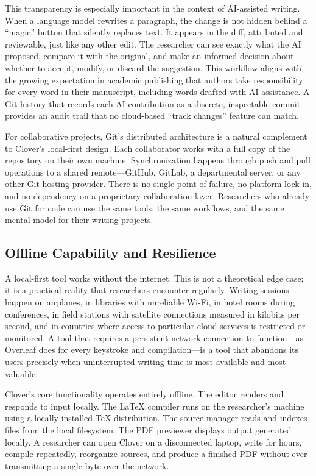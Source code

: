 \documentclass[a4paper,11pt]{article}
\begin{document}
This transparency is especially important in the context of AI-assisted writing. When a language model rewrites a paragraph, the change is not hidden behind a ``magic'' button that silently replaces text. It appears in the diff, attributed and reviewable, just like any other edit. The researcher can see exactly what the AI proposed, compare it with the original, and make an informed decision about whether to accept, modify, or discard the suggestion. This workflow aligns with the growing expectation in academic publishing that authors take responsibility for every word in their manuscript, including words drafted with AI assistance. A Git history that records each AI contribution as a discrete, inspectable commit provides an audit trail that no cloud-based ``track changes'' feature can match.

For collaborative projects, Git's distributed architecture is a natural complement to Clover's local-first design. Each collaborator works with a full copy of the repository on their own machine. Synchronization happens through push and pull operations to a shared remote---GitHub, GitLab, a departmental server, or any other Git hosting provider. There is no single point of failure, no platform lock-in, and no dependency on a proprietary collaboration layer. Researchers who already use Git for code can use the same tools, the same workflows, and the same mental model for their writing projects.

\subsection{Offline Capability and Resilience}

A local-first tool works without the internet. This is not a theoretical edge case; it is a practical reality that researchers encounter regularly. Writing sessions happen on airplanes, in libraries with unreliable Wi-Fi, in hotel rooms during conferences, in field stations with satellite connections measured in kilobits per second, and in countries where access to particular cloud services is restricted or monitored. A tool that requires a persistent network connection to function---as Overleaf does for every keystroke and compilation---is a tool that abandons its users precisely when uninterrupted writing time is most available and most valuable.

Clover's core functionality operates entirely offline. The editor renders and responds to input locally. The \LaTeX{} compiler runs on the researcher's machine using a locally installed TeX distribution. The source manager reads and indexes files from the local filesystem. The PDF previewer displays output generated locally. A researcher can open Clover on a disconnected laptop, write for hours, compile repeatedly, reorganize sources, and produce a finished PDF without ever transmitting a single byte over the network.
\end{document}
